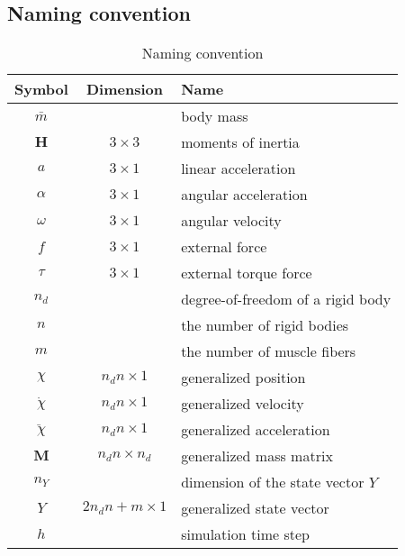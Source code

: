 \documentclass[a4paper,10pt]{article}
\begin{document}
\subsection{Naming convention}
\begin{table}[h!b!p!]
\caption{Naming convention}
\centering
\begin{tabular}{ c c l }
\hline
Symbol           & Dimension                                & Name \\
\hline
$\bar{m}$        &                                          & body mass \\
$\mathbf{H}$     & $3 \times 3$                             & moments of inertia \\
$a$              & $3 \times 1$                             & linear acceleration \\
$\alpha$         & $3 \times 1$                             & angular acceleration \\
$\omega$         & $3 \times 1$                             & angular velocity \\
$f$              & $3 \times 1$                             & external force\\
$\tau$           & $3 \times 1$                             & external torque force\\
$n_d$            &                                          & degree-of-freedom of a rigid body\\
$n$              &                                          & the number of rigid bodies\\
$m$              &                                          & the number of muscle fibers\\
$\chi$           & $n_d n     \times 1$                     & generalized position\\
$\dot\chi$       & $n_d n     \times 1$                     & generalized velocity\\
$\ddot\chi$      & $n_d n     \times 1$                     & generalized acceleration\\
$\mathbf{M}$     & $n_d n     \times n_d$                   & generalized mass matrix\\
$n_Y$            &                                          & dimension of the state vector $Y$\\
$Y$              & $2n_d n + m\times 1$                     & generalized state vector\\
$h$              &                                          & simulation time step\\

\end{tabular}
\end{table}
\end{document}
